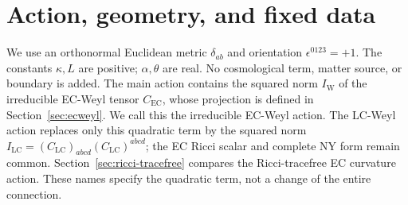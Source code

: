\section{Action, geometry, and fixed data}
\label{sec:revised2}

We use an orthonormal Euclidean metric $\delta_{ab}$ and orientation $\epsilon^{0123}=+1$. The constants $\kappa,L$ are positive; $\alpha,\theta$ are real. No cosmological term, matter source, or boundary is added. The main action contains the squared norm $I_{\mathrm{W}}$ of the irreducible EC-Weyl tensor $C_{\mathrm{EC}}$, whose projection is defined in Section~\ref{sec:ecweyl}. We call this the irreducible EC-Weyl action. The LC-Weyl action replaces only this quadratic term by the squared norm $I_{\mathrm{LC}}=(C_{\mathrm{LC}})_{abcd}(C_{\mathrm{LC}})^{abcd}$; the EC Ricci scalar and complete NY form remain common. Section~\ref{sec:ricci-tracefree} compares the Ricci-tracefree EC curvature action. These names specify the quadratic term, not a change of the entire connection.

